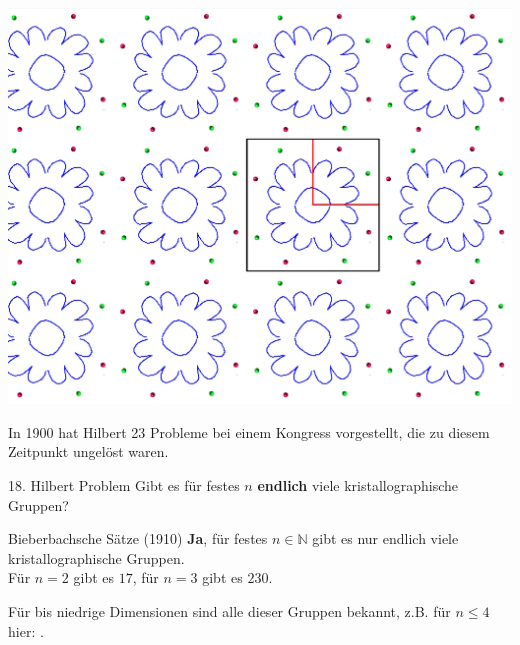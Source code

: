 \documentclass{beamer}
\theoremstyle{plain}
\newcommand\N{\mathbb N}
\begin{document}
\begin{frame}
    \centering
    \includegraphics[width=\textwidth]{images/p4-animation/p4-full-trans.jpg}
\end{frame}

\begin{frame}
    In 1900 hat Hilbert 23 Probleme bei einem Kongress vorgestellt, die zu diesem Zeitpunkt ungelöst waren. \pause
    \begin{block}{18. Hilbert Problem}
        Gibt es für festes $n$ \textbf{endlich} viele kristallographische Gruppen?
    \end{block}
    \pause
    \begin{exampleblock}{Bieberbachsche Sätze (1910)}
        \textbf{Ja}, für festes $n \in \N$ gibt es nur endlich viele kristallographische Gruppen. \\
        Für $n=2$ gibt es $17$, für $n=3$ gibt es $230$.
    \end{exampleblock}
    Für bis niedrige Dimensionen sind alle dieser Gruppen bekannt, z.B. für $n\leq 4$ hier: \cite{crystGrpsDimFour}.
\end{frame}


\end{document}
